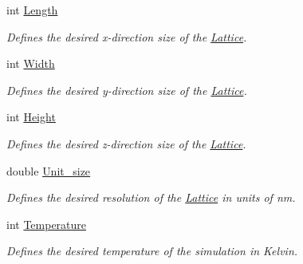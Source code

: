 \begin{DoxyCompactItemize}
\mbox{\label{struct_parameters___simulation_a038f418e1b2e4fec3fc6a8336f8b23de}} 
int \hyperlink{struct_parameters___simulation_a038f418e1b2e4fec3fc6a8336f8b23de}{Length}
\begin{DoxyCompactList}\small\item\em Defines the desired x-\/direction size of the \hyperlink{class_lattice}{Lattice}. \end{DoxyCompactList}\item 
\mbox{\label{struct_parameters___simulation_aab42f7eb6b5ec1916475d9022ed5165f}} 
int \hyperlink{struct_parameters___simulation_aab42f7eb6b5ec1916475d9022ed5165f}{Width}
\begin{DoxyCompactList}\small\item\em Defines the desired y-\/direction size of the \hyperlink{class_lattice}{Lattice}. \end{DoxyCompactList}\item 
\mbox{\label{struct_parameters___simulation_aa1ffb86ac22065dbbb58196db95b3199}} 
int \hyperlink{struct_parameters___simulation_aa1ffb86ac22065dbbb58196db95b3199}{Height}
\begin{DoxyCompactList}\small\item\em Defines the desired z-\/direction size of the \hyperlink{class_lattice}{Lattice}. \end{DoxyCompactList}\item 
\mbox{\label{struct_parameters___simulation_ab5dda6868bc9359d97a614f027734349}} 
double \hyperlink{struct_parameters___simulation_ab5dda6868bc9359d97a614f027734349}{Unit\+\_\+size}
\begin{DoxyCompactList}\small\item\em Defines the desired resolution of the \hyperlink{class_lattice}{Lattice} in units of nm. \end{DoxyCompactList}\item 
\mbox{\label{struct_parameters___simulation_aad5bdf64239620d1b214c49532dba743}} 
int \hyperlink{struct_parameters___simulation_aad5bdf64239620d1b214c49532dba743}{Temperature}
\begin{DoxyCompactList}\small\item\em Defines the desired temperature of the simulation in Kelvin. \end{DoxyCompactList}\item 

\end{DoxyCompactItemize}
